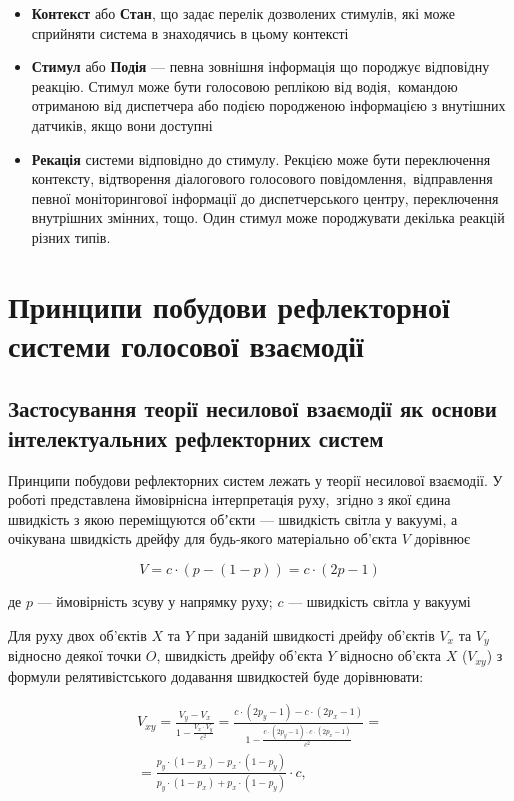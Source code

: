 \begin{itemize}
	\item \textbf{Контекст} або \textbf{Стан}, що задає перелік дозволених стимулів, які може сприйняти система в знаходячись в цьому контексті
	\item \textbf{Стимул} або \textbf{Подія} --- певна зовнішня інформація що породжує відповідну реакцію. Стимул може бути голосовою реплікою від водія, командою отриманою від диспетчера або подією породженою інформацією з внутішних датчиків, якщо вони доступні
	\item \textbf{Рекація} системи відповідно до стимулу. Рекцією може бути переключення контексту, відтворення діалогового голосового повідомлення, відправлення певної моніторингової інформації до диспетчерського центру,  переключення внутрішних змінних, тощо. Один стимул може породжувати декілька реакцій різних типів.
\end{itemize}


\section{Принципи побудови рефлекторної системи голосової взаємодії} \label{sect2_4}

\subsection{Застосування теорії несилової взаємодії як основи інтелектуальних рефлекторних систем} \label{subsect2_4_1}

Принципи побудови рефлекторних систем лежать у теорії несилової взаємодії. У роботі \cite{Teslia_2010} представлена ймовірнісна інтерпретація руху, згідно з якої єдина швидкість з якою переміщуются обʼєкти --- швидкість світла у вакуумі, а очікувана швидкість дрейфу для будь-якого матеріально об'єкта $V$ дорівнює

\[
V=c\cdot(p-(1-p))=c\cdot(2p-1)
\]

\noindent
де $p$ --- ймовірність зсуву у напрямку руху; $c$ --- швидкість світла у вакуумі

Для руху двох об'єктів $X$ та $Y$ при заданій швидкості дрейфу об'єктів $V_x$ та $V_y$ відносно деякої точки $O$, швидкість дрейфу об'єкта $Y$ відносно об'єкта $X$ ($V_{xy}$) з формули релятивістського додавання швидкостей буде дорівнювати:

\begin{equation}
\label{eq:tnv1}
	\begin{multlined}
		V_{xy}=\frac{V_y-V_x}{1-\frac{V_x\cdot V_y}{c^2}}=\frac{c\cdot(2p_y-1)-c\cdot(2p_x-1)}{1-\frac{c\cdot(2p_y-1)\cdot c\cdot(2p_x-1)}{c^2}}= \\
		=\frac{p_y\cdot(1-p_x)-p_x\cdot(1-p_y)}{p_y\cdot(1-p_x)+p_x\cdot(1-p_y)}\cdot c,
	\end{multlined}
\end{equation}

